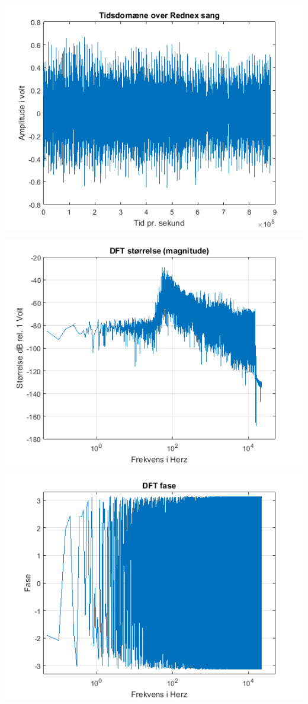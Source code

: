 \documentclass[12pt, letterpaper]{article}
\begin{document}
\begin{center}
\includegraphics[width=\textwidth]{billeder/rednextid}
\end{center}

\begin{center}
\includegraphics[width=\textwidth]{billeder/rednexstorrelse}
\end{center}

\begin{center}
\includegraphics[width=\textwidth]{billeder/rednexfase}
\end{center}
\end{document}
